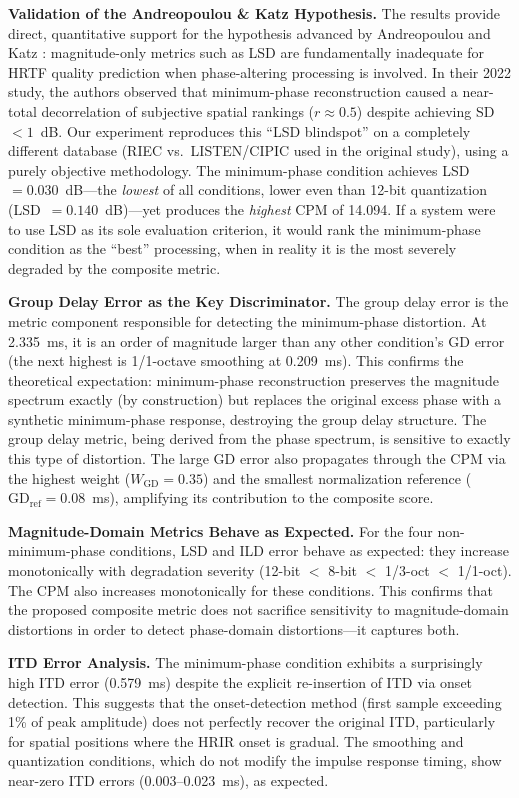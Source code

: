 \documentclass[12pt,a4paper]{article}
\begin{document}
\textbf{Validation of the Andreopoulou \& Katz Hypothesis.}
The results provide direct, quantitative support for the hypothesis advanced by Andreopoulou and Katz \cite{andreopoulou2022}: magnitude-only metrics such as LSD are fundamentally inadequate for HRTF quality prediction when phase-altering processing is involved. In their 2022 study, the authors observed that minimum-phase reconstruction caused a near-total decorrelation of subjective spatial rankings ($r \approx 0.5$) despite achieving SD $< 1$~dB. Our experiment reproduces this ``LSD blindspot'' on a completely different database (RIEC vs.\ LISTEN/CIPIC used in the original study), using a purely objective methodology. The minimum-phase condition achieves LSD~$= 0.030$~dB---the \textit{lowest} of all conditions, lower even than 12-bit quantization (LSD~$= 0.140$~dB)---yet produces the \textit{highest} CPM of 14.094. If a system were to use LSD as its sole evaluation criterion, it would rank the minimum-phase condition as the ``best'' processing, when in reality it is the most severely degraded by the composite metric.

\textbf{Group Delay Error as the Key Discriminator.}
The group delay error is the metric component responsible for detecting the minimum-phase distortion. At 2.335~ms, it is an order of magnitude larger than any other condition's GD error (the next highest is 1/1-octave smoothing at 0.209~ms). This confirms the theoretical expectation: minimum-phase reconstruction preserves the magnitude spectrum exactly (by construction) but replaces the original excess phase with a synthetic minimum-phase response, destroying the group delay structure. The group delay metric, being derived from the phase spectrum, is sensitive to exactly this type of distortion. The large GD error also propagates through the CPM via the highest weight ($W_{\mathrm{GD}} = 0.35$) and the smallest normalization reference ($\mathrm{GD}_{\mathrm{ref}} = 0.08$~ms), amplifying its contribution to the composite score.

\textbf{Magnitude-Domain Metrics Behave as Expected.}
For the four non-minimum-phase conditions, LSD and ILD error behave as expected: they increase monotonically with degradation severity (12-bit $<$ 8-bit $<$ 1/3-oct $<$ 1/1-oct). The CPM also increases monotonically for these conditions. This confirms that the proposed composite metric does not sacrifice sensitivity to magnitude-domain distortions in order to detect phase-domain distortions---it captures both.

\textbf{ITD Error Analysis.}
The minimum-phase condition exhibits a surprisingly high ITD error (0.579~ms) despite the explicit re-insertion of ITD via onset detection. This suggests that the onset-detection method (first sample exceeding 1\% of peak amplitude) does not perfectly recover the original ITD, particularly for spatial positions where the HRIR onset is gradual. The smoothing and quantization conditions, which do not modify the impulse response timing, show near-zero ITD errors (0.003--0.023~ms), as expected.
\end{document}
